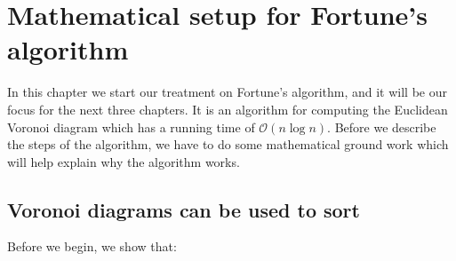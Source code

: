 \chapter{Mathematical setup for Fortune's algorithm}

In this chapter we start our treatment on Fortune's algorithm, and it will be our focus for the next three chapters. It is an algorithm for computing the Euclidean Voronoi diagram which has a running time of $\mathcal{O}(n \log n)$. Before we describe the steps of the algorithm, we have to do some mathematical ground work which will help explain why the algorithm works.

\section{Voronoi diagrams can be used to sort}
Before we begin, we show that:

